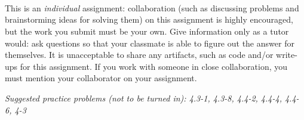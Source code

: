 \documentclass[letterpaper,11pt]{article}
\begin{document}


 \\

 \\

 \\

This is an \emph{individual} assignment: collaboration (such as discussing problems and brainstorming ideas for solving them) on this assignment is highly encouraged, but the work you submit must be your own. Give information only as a tutor would: ask questions so that your classmate is able to figure out the answer for themselves. It is unacceptable to share any artifacts, such as code and/or write-ups for this assignment. If you work with someone in close collaboration, you must mention your collaborator on your assignment.

\emph{Suggested practice problems (not to be turned in): 4.3-1, 4.3-8, 4.4-2, 4.4-4, 4.4-6, 4-3}
\end{document}

